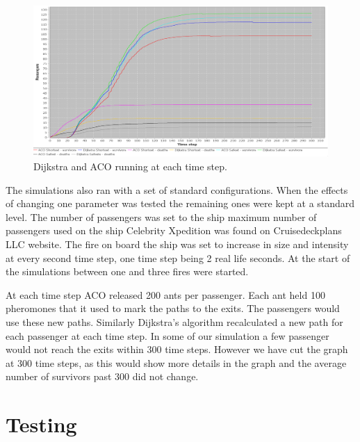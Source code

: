 \begin{figure} [h]
\centering
\hspace*{-1.0in}
\includegraphics[scale=0.35]{images/Graph-using-200-rounds-140-passangers.png}
\caption{Dijkstra and ACO running at each time step.}
\label{fig:celeb}
\end{figure}
The simulations also ran with a set of standard configurations. When the effects of changing one parameter was tested the remaining ones were kept at a standard level. The number of passengers was set to the ship maximum number of passengers used on the ship Celebrity Xpedition was found on Cruisedeckplans LLC website\cite{cruseships}. The fire on board the ship was set to increase in size and intensity at every second time step, one time step being 2 real life seconds. At the start of the simulations between one and three fires were started.

At each time step ACO released 200 ants per passenger. Each ant held 100 pheromones that it used to mark the paths to the exits. The passengers would use these new paths. Similarly Dijkstra's algorithm recalculated a new path for each passenger at each time step. In some of our simulation a few passenger would not reach the exits within 300 time steps. However we have cut the graph at 300 time steps, as this would show more details in the graph and the average number of survivors past 300 did not change. 

\section{Testing}


